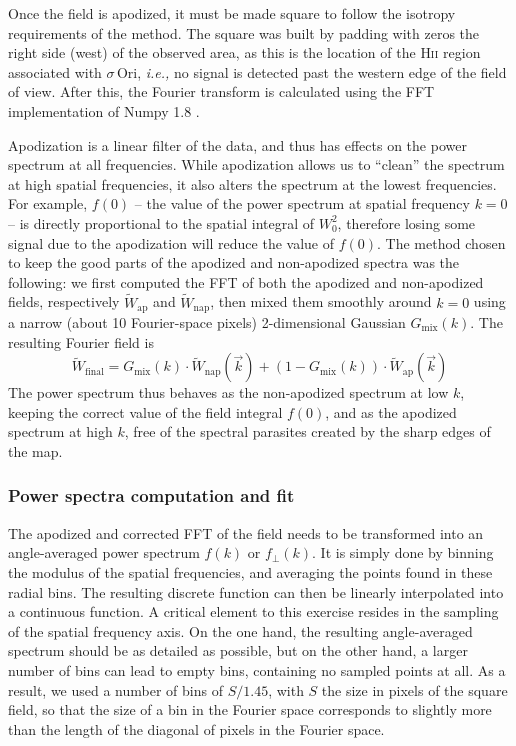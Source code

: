 \documentclass[structabstract]{aa}
\newcommand{\ie}{{\em i.e.,}}
\newcommand{\emm}[1]{\ensuremath{#1}}
\newcommand{\emr}[1]{\emm{\mathrm{#1}}}
\newcommand{\Hii}{\textsc{Hii}}
\begin{document}
Once the field is apodized, it must be made square to follow the isotropy requirements of the method. The square was built by padding with zeros the right side (west) of the observed area, as this is the location of the \Hii{} region associated with $\sigma$\,Ori, \ie{} no signal is detected past the western edge of the field of view. After this, the Fourier transform is calculated using the FFT implementation of Numpy 1.8 \citep{CT65}.

Apodization is a linear filter of the data, and thus has effects on the power spectrum at all frequencies. While apodization allows us to ``clean'' the spectrum at high spatial frequencies, it also alters the spectrum at the lowest frequencies. For example, $f(0)$ -- the value of the power spectrum at spatial frequency $k=0$ -- is directly proportional to the spatial integral of $W_0^2$, therefore losing some signal due to the apodization will reduce the value of $f(0)$. The method chosen to keep the good parts of the apodized and non-apodized spectra was the following: we first computed the FFT of both the apodized and non-apodized fields, respectively $\tilde{W}_\emr{ap}$ and $\tilde{W}_\emr{nap}$, then mixed them smoothly around $k = 0$ using a narrow (about 10 Fourier-space pixels) 2-dimensional Gaussian $G_\emr{mix}(k)$. The resulting Fourier field is
\begin{equation}
  \label{eq:fourier}
 \tilde{W}_\emr{final} = G_\emr{mix}(k)\cdot\tilde{W}_\emr{nap}(\vec{k}) + \left(1- G_\emr{mix}(k)\right)\cdot\tilde{W}_\emr{ap}(\vec{k})
\end{equation}
The power spectrum thus behaves as the non-apodized spectrum at low $k$, keeping the correct value of the field integral $f(0)$, and as the apodized spectrum at high $k$, free of the spectral parasites created by the sharp edges of the map.

\subsubsection{Power spectra computation and fit}
\label{sec:powerspectra}
The apodized and corrected FFT of the field needs to be transformed into an angle-averaged power spectrum $f(k)$ or $f_\perp(k)$. It is simply done by binning the modulus of the spatial frequencies, and averaging the points found in these radial bins. The resulting discrete function can then be linearly interpolated into a continuous function. A critical element to this exercise resides in the sampling of the spatial frequency axis. On the one hand, the resulting angle-averaged spectrum should be as detailed as possible, but on the other hand, a larger number of bins can lead to empty bins, containing no sampled points at all. As a result, we used a number of bins of $S/1.45$, with $S$ the size in pixels of the square field, so that the size of a bin in the Fourier space corresponds to slightly more than the length of the diagonal of pixels in the Fourier space.
\end{document}
